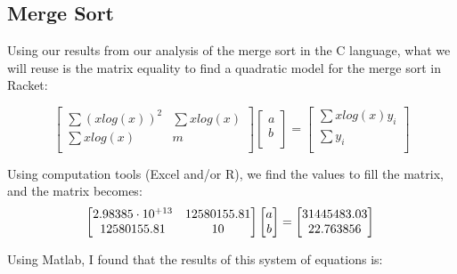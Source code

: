 \documentclass[]{report}
\begin{document}
		 		\subsection{Merge Sort}
		 		
		 		Using our results from our analysis of the merge sort in the C language, what we will reuse is the matrix equality to find a quadratic model for the merge sort in Racket:
		 		
		 		\begin{equation}
						\begin{bmatrix}
						\sum (x log(x))^2 & \sum x log(x) \\
						\sum x log(x) & m \\
						\end{bmatrix}
						\begin{bmatrix}
						a \\
						b \\
						\end{bmatrix}
						=
						\begin{bmatrix}
						\sum x log(x) y_i\\
						\sum y_i \\
						\end{bmatrix}
				\end{equation}
				
				Using computation tools (Excel and/or R), we find the values to fill the matrix, and the matrix becomes:
				\\
				\begin{equation}
						\begin{bmatrix}
						2.98385 \cdot 10^{+13} & 12580155.81 \\
						12580155.81 & 10 \\
						\end{bmatrix}
						\begin{bmatrix}
						a \\
						b \\
						\end{bmatrix}
						=
						\begin{bmatrix}
						31445483.03 \\
						22.763856 \\
						\end{bmatrix} \\
				\end{equation}				
		 		
		 		Using Matlab, I found that the results of this system of equations is:
		 		
\end{document}
